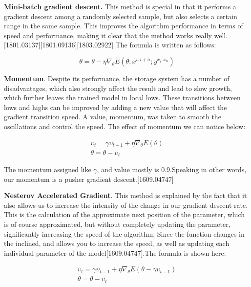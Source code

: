 \par \textbf{Mini-batch gradient descent.} This method is special in that it performs a gradient descent among a randomly selected sample, but also selects a certain range in the same sample. This improves the algorithm performance in terms of speed and performance, making it clear that the method works really well.[1801.03137][1801.09136][1803.02922] The formula is written as follows:


\begin{equation}
\theta = \theta- {\eta}{\nabla_\theta}E(\theta;x^{i:i+n};y^{x_i:x_n}) 
\end{equation}

\par \textbf{Momentum}. Despite its performance, the storage system has a number of disadvantages, which also strongly affect the result and lead to slow growth, which further leaves the trained model in local lows. These transitions between lows and highs can be improved by adding a new value that will affect the gradient transition speed. A value, momentum, was taken to smooth the oscillations and control the speed. The effect of momentum we can notice below:

\begin{equation}
\begin{split}
\upsilon_t = \gamma\upsilon_{t-1} + \eta\nabla_\theta E(\theta) \\
\theta = \theta - \upsilon_t
\end{split}
\end{equation}


\par The momentum assigned like $\gamma$, and value mostly is 0.9.Speaking in other words, our momentum is a pusher gradient descent.[1609.04747]


\par \textbf{Nesterov Accelerated Gradient}. This method is explained by the fact that it also allows us to increase the intensity of the change in our gradient descent rate. This is the calculation of the approximate next position of the parameter, which is of course approximated, but without completely updating the parameter, significantly increasing the speed of the algorithm. Since the function changes in the inclined, and allows you to increase the speed, as well as updating each individual parameter of the model[1609.04747].The formula is shown here:

\begin{equation}
\begin{split}
\upsilon_t = \gamma\upsilon_{t-1} + \eta\nabla_\theta E(\theta - \gamma\upsilon_{t-1}) \\
\theta = \theta - \upsilon_t
\end{split}
\end{equation}

